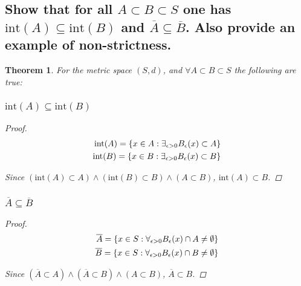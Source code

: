 \documentclass[]{article}
\newtheorem{theorem}{Theorem}
\begin{document}
\subsection{Show that for all $A \subset B \subset S$ 
one has $\text{int}(A)\subseteq \text{int}(B)$ and $\overline{A}\subseteq\overline{B}$. 
Also provide an example of non-strictness.}

\begin{theorem}
    For the metric space $(S,d)$, and $\forall A \subset B \subset S$ the following are true: 
    \subsubsection{$\text{int}(A) \subseteq \text{int}(B)$}
    \begin{proof}
        \begin{align*}
            \text{int}(A) = \qty{x \in A : \exists_{\epsilon>0} B_\epsilon(x) \subset A}\\
            \text{int}(B) = \qty{x \in B : \exists_{\epsilon>0} B_\epsilon(x) \subset B}
        \end{align*}
        
        Since $(\text{int}(A) \subset A) \land (\text{int}(B) \subset B) \land (A \subset B)$,
        $\text{int}(A)\subset B$.



    \end{proof}
    \subsubsection{$\overline{A} \subseteq \overline{B}$}
    \begin{proof}
        \begin{align*}
            \overline{A} = \qty{x \in S : \forall_{\epsilon> 0} B_\epsilon(x) \cap A \neq \emptyset}\\
            \overline{B} = \qty{x \in S : \forall_{\epsilon> 0} B_\epsilon(x) \cap B \neq \emptyset}
        \end{align*}

        Since $(\overline{A} \subset A) \land (\overline{A} \subset B) \land (A \subset B)$,
        $\overline{A}\subset B$.



    \end{proof}
\end{theorem}
\end{document}
